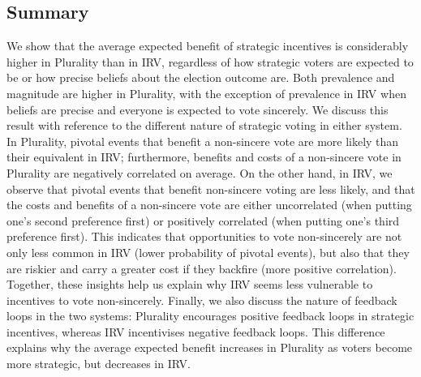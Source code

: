 \documentclass[11pt, letter]{article}
\begin{document}
\subsection{Summary}

We show that the average expected benefit of strategic incentives is considerably higher in Plurality than in IRV, regardless of how strategic voters are expected to be or how precise beliefs about the election outcome are. Both prevalence and magnitude are higher in Plurality, with the exception of prevalence in IRV when beliefs are precise and everyone is expected to vote sincerely. We discuss this result with reference to the different nature of strategic voting in either system. In Plurality, pivotal events that benefit a non-sincere vote are more likely than their equivalent in IRV; furthermore, benefits and costs of a non-sincere vote in Plurality are negatively correlated on average. On the other hand, in IRV, we observe that pivotal events that benefit non-sincere voting are less likely, and that the costs and benefits of a non-sincere vote are either uncorrelated (when putting one's second preference first) or positively correlated (when putting one's third preference first). This indicates that opportunities to vote non-sincerely are not only less common in IRV (lower probability of pivotal events), but also that they are riskier and carry a greater cost if they backfire (more positive correlation). Together, these insights help us explain why IRV seems less vulnerable to incentives to vote non-sincerely. Finally, we also discuss the nature of feedback loops in the two systems: Plurality encourages positive feedback loops in strategic incentives, whereas IRV incentivises negative feedback loops. This difference explains why the average expected benefit increases in Plurality as voters become more strategic, but decreases in IRV.




\end{document}
